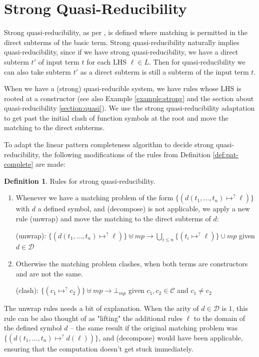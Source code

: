 \documentclass{report}
\theoremstyle{definition}
\newtheorem{definition_inner}{Definition}
\newenvironment{definition}
  {\begin{customblock}\begin{definition_inner}}
  {\end{definition_inner}\end{customblock}}
\begin{document}
\section{Strong Quasi-Reducibility}\label{section:strong-quasi}
Strong quasi-reducibility, as per \cite{aoto}, is defined where matching is permitted in the direct subterms of the basic term. Strong quasi-reducibility naturally implies quasi-reducibility, since if we have strong quasi-reducibility, we have a direct subterm $t'$ of input term $t$ for each LHS $\ell \in L$. Then for quasi-reducibility we can also take subterm $t'$ as a direct subterm is still a subterm of the input term $t$.

When we have a (strong) quasi-reducible system, we have rules whose LHS is rooted at a constructor (see also Example \ref{example:strong} and the section about quasi-reducibility \ref{section:quasi}). We use the strong quasi-reducibility adaptation to get past the initial clash of function symbols at the root and move the matching to the direct subterms.

To adapt the linear pattern completeness algorithm to decide strong quasi-reducibility, the following modifications of the rules from Definition \ref{def:pat-complete} are made:

\begin{definition} Rules for strong quasi-reducibility.
\begin{enumerate}
    \item Whenever we have a matching problem of the form $\{(d(t_1, \dots, t_n)\mapsto^? \ell)\}$ with $d$ a defined symbol, and (decompose) is not applicable, we apply a new rule (unwrap) and move the matching to the direct subterms of $d$:

    (unwrap): $\{(d(t_1,\dots,t_n)\mapsto^? \ell)\} \uplus mp \rightarrow \bigcup_{i \leq n}\{(t_i\mapsto^? \ell)\} \cup mp$ given $d \in \mathcal{D}$
    
    \item Otherwise the matching problem clashes, when both terms are constructors and are not the same.

    (clash): $\{(c_1 \mapsto^? c_2)\} \uplus mp \rightarrow \bot_{mp}$ given $c_1, c_2 \in \mathcal{C}$ and $c_1 \neq c_2$
\end{enumerate}
\end{definition}

The unwrap rules needs a bit of explanation. When the arity of $d \in \mathcal{D}$ is $1$, this rule can be also thought of as "lifting" the additional rules $\ell$ to the domain of the defined symbol $d$ – the same result if the original matching problem was $\{(d(t_1,\dots,t_n) \mapsto^? d(\ell))\}$, and (decompose) would have been applicable, ensuring that the computation doesn't get stuck immediately.
\end{document}
